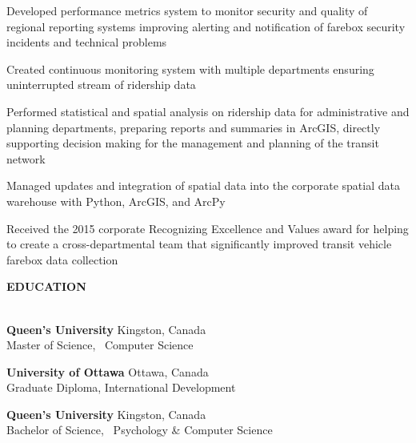 \documentclass[letterpaper]{article}
\newcommand{\lineunder} {
        \vspace*{-8pt} \\
        \hspace*{-18pt} \hrulefill \\
    }
\newcommand{\header} [1] {
        \vspace{9pt}
        {\hspace*{-18pt}\vspace*{6pt} \large \textbf {#1}}
        \vspace*{-6pt} \lineunder
        \vspace{2pt}
    }
\newenvironment{jobtasklist}
        {
            \vspace{-12pt}
            \begin{itemize} \itemsep 0pt
        }{
            \end{itemize}
            \vspace{-3pt}
        }
\newcommand{\university}[3]{
        \textbf{#1}  %
        \hfill #2\\  %
        #3\\         %
        \vspace{2mm}
    }
\begin{document}
\begin{jobtasklist}
{        \item Developed performance metrics system to monitor security and quality
                of regional reporting systems improving alerting and notification of
                farebox security incidents and technical problems

        \item Created continuous monitoring system with multiple departments
                ensuring uninterrupted stream of ridership data

        \item Performed statistical and spatial analysis on ridership data for administrative
                and planning departments, preparing reports and summaries in ArcGIS,
                directly supporting decision making for the management and planning of the
                transit network

        \item Managed updates and integration of spatial data into the corporate spatial data warehouse
                with Python, ArcGIS, and ArcPy

        \item Received the 2015 corporate Recognizing Excellence and Values award
                for helping to create a cross-departmental team that significantly
                improved transit vehicle farebox data collection
    }


\end{jobtasklist}



\header{EDUCATION}
    \university
        {Queen's University}
        {Kingston, Canada}
        {Master of Science, ~Computer Science}

    \university
        {University of Ottawa}
        {Ottawa, Canada}
        {Graduate Diploma, International Development}

    \university
        {Queen's University}
        {Kingston, Canada}
        {Bachelor of Science, ~Psychology \& Computer Science}
\end{document}
